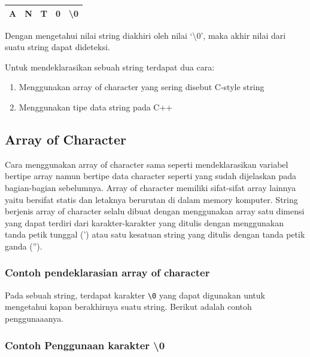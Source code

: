 \begin{tabular}{|c|c|c|c|c|}
\hline
A & N & T & 0 & \textbackslash{0}\\ \hline
\end{tabular}


Dengan mengetahui nilai string diakhiri oleh nilai `\textbackslash{}0', maka akhir
nilai dari suatu string dapat dideteksi.

Untuk mendeklarasikan sebuah string terdapat dua cara:

\begin{enumerate}


\item
 Menggunakan array of character yang sering disebut
 C-style string
\item
 Menggunakan tipe data string pada C++
\end{enumerate}

\subsection{Array of Character}\label{array-of-character}

Cara menggunakan array of character sama seperti mendeklarasikan
variabel bertipe array namun bertipe data character seperti yang sudah
dijelaskan pada bagian-bagian sebelumnya. Array of character memiliki
sifat-sifat array lainnya yaitu bersifat statis dan letaknya berurutan
di dalam memory komputer. String berjenis array of character selalu
dibuat dengan menggunakan array satu dimensi yang dapat terdiri dari
karakter-karakter yang ditulis dengan menggunakan tanda petik tunggal
(') atau satu kesatuan string yang ditulis dengan tanda petik ganda
('').

\subsubsection*{Contoh pendeklarasian array of character}



Pada sebuah string, terdapat karakter \texttt{\textbackslash{}0} yang
dapat digunakan untuk mengetahui kapan berakhirnya suatu string. Berikut
adalah contoh penggunaaanya.

\subsubsection*{Contoh Penggunaan karakter \textbackslash{0}}


